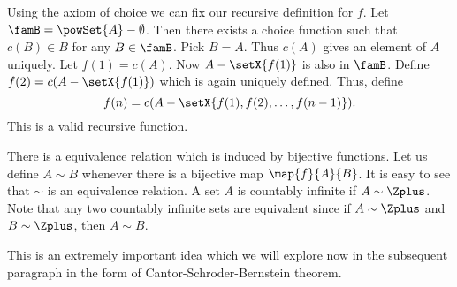 Using the axiom of choice we can fix our recursive definition for $f$. 
Let $\famB = \powSet{A}-\emptyset$. Then there exists a choice function such that $c(B) \in B$ for any $B \in
\famB$. Pick $B = A$. Thus $c(A)$ gives an element of $A$ uniquely.
Let $f(1) = c(A)$.
Now $A - \setX{f(1)}$ is also in $\famB$. Define $f(2) = c(A - \setX{f(1)})$ which is again uniquely defined.
Thus, define
\[f(n) = c(A - \setX{f(1),f(2),\ldots,f(n-1)}).\]
This is a valid recursive function.


There is a equivalence relation which is induced by bijective functions.
Let us define $A\sim B$ whenever there is a bijective map $\map{f}{A}{B}$. It is easy to see that $\sim$ is an
equivalence relation. A set $A$ is countably infinite if $A \sim \Zplus$. Note that any two countably infinite
sets are equivalent since if $A\sim \Zplus$ and $B \sim \Zplus$, then $A \sim B$. 

This is an extremely
important idea which we will explore now in the subsequent paragraph in the form of Cantor-Schroder-Bernstein
theorem.

